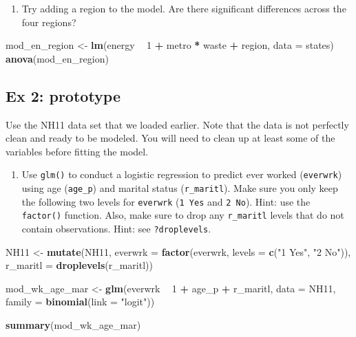 \documentclass[]{book}
\newenvironment{Shaded}{\begin{snugshade}}{\end{snugshade}}
\newcommand{\KeywordTok}[1]{\textcolor[rgb]{0.13,0.29,0.53}{\textbf{#1}}}
\newcommand{\DataTypeTok}[1]{\textcolor[rgb]{0.13,0.29,0.53}{#1}}
\newcommand{\DecValTok}[1]{\textcolor[rgb]{0.00,0.00,0.81}{#1}}
\newcommand{\StringTok}[1]{\textcolor[rgb]{0.31,0.60,0.02}{#1}}
\newcommand{\OperatorTok}[1]{\textcolor[rgb]{0.81,0.36,0.00}{\textbf{#1}}}
\newcommand{\NormalTok}[1]{#1}
\providecommand{\tightlist}{%
  \setlength{\itemsep}{0pt}\setlength{\parskip}{0pt}}
\begin{document}
\begin{enumerate}
\def\labelenumi{\arabic{enumi}.}
\setcounter{enumi}{1}
\tightlist
\item
  Try adding a region to the model. Are there significant differences
  across the four regions?
\end{enumerate}

\begin{Shaded}
\begin{Highlighting}[]
\NormalTok{  mod_en_region <-}\StringTok{ }\KeywordTok{lm}\NormalTok{(energy }\OperatorTok{~}\StringTok{ }\DecValTok{1} \OperatorTok{+}\StringTok{ }\NormalTok{metro }\OperatorTok{*}\StringTok{ }\NormalTok{waste }\OperatorTok{+}\StringTok{ }\NormalTok{region, }\DataTypeTok{data =}\NormalTok{ states)}
  \KeywordTok{anova}\NormalTok{(mod_en_region)}
\end{Highlighting}
\end{Shaded}

\subsection{Ex 2: prototype}\label{ex-2-prototype}

Use the NH11 data set that we loaded earlier. Note that the data is not
perfectly clean and ready to be modeled. You will need to clean up at
least some of the variables before fitting the model.

\begin{enumerate}
\def\labelenumi{\arabic{enumi}.}
\tightlist
\item
  Use \texttt{glm()} to conduct a logistic regression to predict ever
  worked (\texttt{everwrk}) using age (\texttt{age\_p}) and marital
  status (\texttt{r\_maritl}). Make sure you only keep the following two
  levels for \texttt{everwrk} (\texttt{1\ Yes} and \texttt{2\ No}).
  Hint: use the \texttt{factor()} function. Also, make sure to drop any
  \texttt{r\_maritl} levels that do not contain observations. Hint: see
  \texttt{?droplevels}.
\end{enumerate}

\begin{Shaded}
\begin{Highlighting}[]
\NormalTok{  NH11 <-}\StringTok{ }\KeywordTok{mutate}\NormalTok{(NH11,}
                     \DataTypeTok{everwrk =} \KeywordTok{factor}\NormalTok{(everwrk, }\DataTypeTok{levels =} \KeywordTok{c}\NormalTok{(}\StringTok{"1 Yes"}\NormalTok{, }\StringTok{"2 No"}\NormalTok{)),}
                     \DataTypeTok{r_maritl =} \KeywordTok{droplevels}\NormalTok{(r_maritl))}

\NormalTok{  mod_wk_age_mar <-}\StringTok{ }\KeywordTok{glm}\NormalTok{(everwrk }\OperatorTok{~}\StringTok{ }\DecValTok{1} \OperatorTok{+}\StringTok{ }\NormalTok{age_p }\OperatorTok{+}\StringTok{ }\NormalTok{r_maritl, }
                        \DataTypeTok{data =}\NormalTok{ NH11,}
                        \DataTypeTok{family =} \KeywordTok{binomial}\NormalTok{(}\DataTypeTok{link =} \StringTok{"logit"}\NormalTok{))}

  \KeywordTok{summary}\NormalTok{(mod_wk_age_mar)}
\end{Highlighting}
\end{Shaded}
\end{document}
